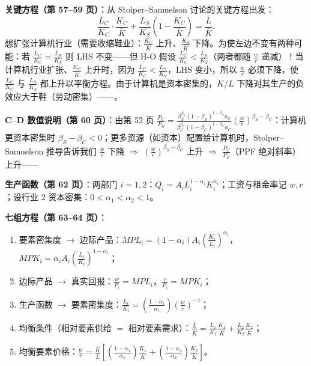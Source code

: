 
\textbf{关键方程（第 57--59 页）}：从 Stolper--Samuelson 讨论的关键方程出发：
\[
\frac{L_C}{K_C} \cdot \frac{K_C}{\bar{K}} + \frac{L_S}{K_S} \left( 1 - \frac{K_C}{\bar{K}} \right) = \frac{\bar{L}}{\bar{K}} .
\]
想扩张计算机行业（需要收缩鞋业）：$\frac{K_C}{\bar{K}}$ 上升、$\frac{K_S}{\bar{K}}$ 下降。为使左边不变有两种可能：若 $\frac{L_C}{K_C} = \frac{L_S}{K_S}$ 则 LHS 不变——但 H-O 假设 $\frac{L_C}{K_C} < \frac{L_S}{K_S}$（两者都随 $\frac{w}{r}$ 递减）！当计算机行业扩张、$\frac{K_C}{\bar K}$ 上升时，因为 $\frac{L_C}{K_C} < \frac{L_S}{K_S}$，LHS 变小，所以 $\frac{w}{r}$ 必须下降，使 $\frac{L_C}{K_C}$ 与 $\frac{L_S}{K_S}$ 都上升以平衡方程。由于计算机是资本密集的，$K/L$ 下降对其生产的负效应大于鞋（劳动密集）——。

\textbf{C--D 数值说明（第 60 页）}：由第 52 页 $\frac{P_C}{P_S} = \frac{\beta_S^{\beta_S}(1-\beta_S)^{1-\beta_S} a_S}{\beta_C^{\beta_C}(1-\beta_C)^{1-\beta_C} a_C} \left( \frac{w}{r} \right)^{\beta_S - \beta_C}$：计算机更资本密集时 $\beta_S - \beta_C < 0$；更多资源（如资本）配置给计算机时，Stolper--Samuelson 推导告诉我们 $\frac{w}{r}$ 下降 $\Rightarrow$ $\left( \frac{w}{r} \right)^{\beta_S - \beta_C}$ 上升 $\Rightarrow$ $\frac{P_C}{P_S}$（PPF 绝对斜率）上升——


\textbf{生产函数（第 62 页）}：两部门 $i = 1, 2$：$Q_i = A_i L_i^{1-\alpha_i} K_i^{\alpha_i}$；工资与租金率记 $w, r$；设行业 2 资本密集：$0 < \alpha_1 < \alpha_2 < 1$。

\textbf{七组方程（第 63--64 页）}：
\begin{enumerate}
  \item 要素密集度 $\to$ 边际产品：$MPL_i = (1-\alpha_i) A_i \left( \frac{K_i}{L_i} \right)^{\alpha_i}$，$MPK_i = \alpha_i A_i \left( \frac{L_i}{K_i} \right)^{1-\alpha_i}$；
  \item 边际产品 $\to$ 真实回报：$\frac{w}{P_i} = MPL_i$，$\frac{r}{P_i} = MPK_i$；
  \item 生产函数 $\to$ 要素密集度：$\frac{L_i}{K_i} = \left( \frac{1-\alpha_i}{\alpha_i} \right) \left( \frac{w}{r} \right)^{-1}$；
  \item 均衡条件（相对要素供给 $=$ 相对要素需求）：$\frac{\bar{L}}{\bar{K}} = \frac{L_1}{K_1} \frac{K_1}{\bar{K}} + \frac{L_2}{K_2} \frac{K_2}{\bar{K}}$；
  \item 均衡要素价格：$\frac{w}{r} = \frac{\bar{K}}{\bar{L}} \left[ \left( \frac{1-\alpha_1}{\alpha_1} \right) \frac{K_1}{\bar{K}} + \left( \frac{1-\alpha_2}{\alpha_2} \right) \frac{K_2}{\bar{K}} \right]$。
\end{enumerate}

